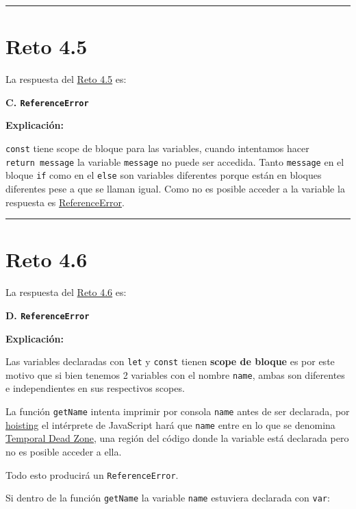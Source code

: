 \documentclass[
  letterpaper,
  DIV=11,
  numbers=noendperiod]{scrreprt}
\begin{document}
\begin{center}\rule{0.5\linewidth}{0.5pt}\end{center}

\section{Reto 4.5}\label{sec-sol-cap4-reto5}

La respuesta del \hyperref[sec-cap4-reto5]{Reto 4.5} es:

\textbf{C. \texttt{ReferenceError}}

\textbf{Explicación:}

\texttt{const} tiene scope de bloque para las variables, cuando
intentamos hacer \texttt{return\ message} la variable \texttt{message}
no puede ser accedida. Tanto \texttt{message} en el bloque \texttt{if}
como en el \texttt{else} son variables diferentes porque están en
bloques diferentes pese a que se llaman igual. Como no es posible
acceder a la variable la respuesta es
\hyperref[glos-referenceerror]{ReferenceError}.

\begin{center}\rule{0.5\linewidth}{0.5pt}\end{center}

\section{Reto 4.6}\label{sec-sol-cap4-reto6}

La respuesta del \hyperref[sec-cap4-reto6]{Reto 4.6} es:

\textbf{D. \texttt{ReferenceError}}

\textbf{Explicación:}

Las variables declaradas con \texttt{let} y \texttt{const} tienen
\textbf{scope de bloque} es por este motivo que si bien tenemos 2
variables con el nombre \texttt{name}, ambas son diferentes e
independientes en sus respectivos scopes.

La función \texttt{getName} intenta imprimir por consola \texttt{name}
antes de ser declarada, por \hyperref[glos-hoisting]{hoisting} el
intérprete de JavaScript hará que \texttt{name} entre en lo que se
denomina \hyperref[glos-temporal_dead_zone]{Temporal Dead Zone}, una
región del código donde la variable está declarada pero no es posible
acceder a ella.

Todo esto producirá un \texttt{ReferenceError}.

Si dentro de la función \texttt{getName} la variable \texttt{name}
estuviera declarada con \texttt{var}:
\end{document}
